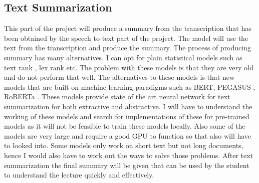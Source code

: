 \documentclass[11pt,a4paper]{article}
\begin{document}
	\subsection{Text Summarization}
	This part of the project will produce a summary from the transcription that has been obtained by the speech to text part of the project. The model will use the text from the transcription and produce the summary. The process of producing summary has many alternatives. I can opt for plain statistical models such as  text rank \citep{mihalcea-2005-language}, lex rank \citep{steinberger-etal-2005-improving} etc. The problem with these models is that they are very old and do not perform that well. The alternatives to these models is that new models that are built on machine learning paradigms such as BERT, PEGASUS \citep{zhang2020pegasus}, RoBERTa \citep{liu2019roberta}. These models provide state of the art neural network for text summarization for both extractive and abstractive. I will have to understand the working of these models and search for implementations of these for pre-trained models as it will not be feasible to train these models locally. Also some of the models are very large and require a good GPU to function so that also will have to looked into. Some models only work on short text but not long documents, hence I would also have to work out the ways to solve those problems. After text summarization the final summary will be given that can be used by the student to understand the lecture quickly and effectively.
	
	
	
	
	
	
	
	
	
\end{document}
